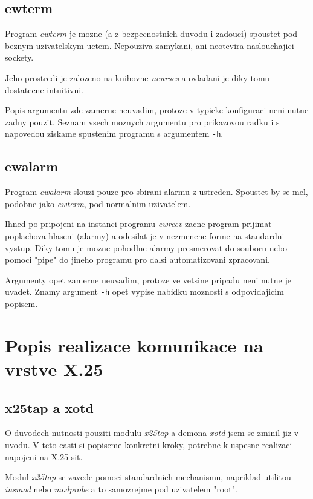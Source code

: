 \documentclass[a4paper,12pt]{article}
\begin{document}
\subsection{ewterm}

Program \emph{ewterm} je mozne (a z bezpecnostnich duvodu i zadouci) spoustet
pod beznym uzivatelskym uctem. Nepouziva zamykani, ani neotevira naslouchajici
sockety.

Jeho prostredi je zalozeno na knihovne \emph{ncurses} a ovladani je
diky tomu dostatecne intuitivni.

Popis argumentu zde zamerne neuvadim, protoze v typicke konfiguraci neni
nutne zadny pouzit.
Seznam vsech moznych argumentu pro prikazovou radku i s napovedou ziskame
spustenim programu s argumentem \verb!-h!.

\subsection{ewalarm}

Program \emph{ewalarm} slouzi pouze pro sbirani alarmu z ustreden. Spoustet by se
mel, podobne jako \emph{ewterm}, pod normalnim uzivatelem.

Ihned po pripojeni na instanci programu \emph{ewrecv} zacne program prijimat
poplachova hlaseni (alarmy) a odesilat je v nezmenene forme na standardni vystup.
Diky tomu je mozne pohodlne alarmy presmerovat do souboru nebo pomoci "pipe"
do jineho programu pro dalsi automatizovani zpracovani.

Argumenty opet zamerne neuvadim, protoze ve vetsine pripadu neni nutne je uvadet.
Znamy argument \verb!-h! opet vypise nabidku moznosti s odpovidajicim popisem.

\section{Popis realizace komunikace na vrstve X.25}

\subsection{x25tap a xotd}

O duvodech nutnosti pouziti modulu \emph{x25tap} a demona \emph{xotd} jsem
se zminil jiz v uvodu. V teto casti si popiseme konkretni kroky, potrebne
k uspesne realizaci napojeni na X.25 sit.

Modul \emph{x25tap} se zavede pomoci standardnich mechanismu, napriklad utilitou
\emph{insmod} nebo \emph{modprobe} a to samozrejme pod uzivatelem "root".
\end{document}
